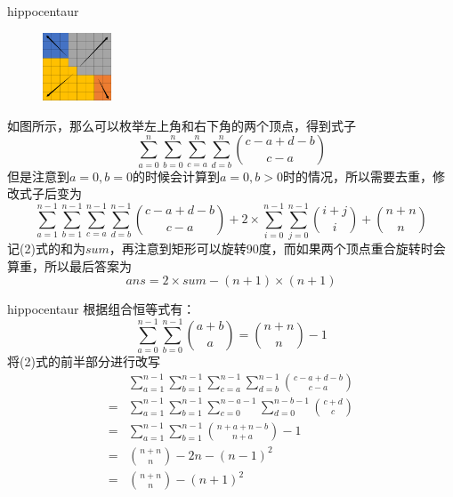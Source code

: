 \documentclass[9pt]{beamer}
\begin{document}
  \begin{frame}{hippocentaur}
    \begin{figure}[htbp]
      \centering\includegraphics[width=0.8in]{insol.png}
      \end{figure}
     如图所示，那么可以枚举左上角和右下角的两个顶点，得到式子
    \begin{equation}
      \sum_{a=0}^n\sum_{b=0}^n\sum_{c=a}^n\sum_{d=b}^n \binom{c-a+d-b}{c-a}
    \end{equation}
     但是注意到$a=0,b=0$的时候会计算到$a=0,b>0$时的情况，所以需要去重，修改式子后变为
    \begin{equation}
      \sum_{a=1}^{n-1}\sum_{b=1}^{n-1}\sum_{c=a}^{n-1}\sum_{d=b}^{n-1} \binom{c-a+d-b}{c-a}+2\times \sum_{i=0}^{n-1}\sum_{j=0}^{n-1}\binom{i+j}{i}+\binom{n+n}{n}
    \end{equation}
     记(2)式的和为$sum$，再注意到矩形可以旋转90度，而如果两个顶点重合旋转时会算重，所以最后答案为
    \begin{equation}
      ans=2\times sum-(n+1)\times (n+1)
    \end{equation}
  \end{frame}

  \begin{frame}{hippocentaur}
     根据组合恒等式有：
    \begin{equation}
      \sum_{a=0}^{n-1}\sum_{b=0}^{n-1}\binom{a+b}{a}=\binom{n+n}{n}-1
    \end{equation}
     将(2)式的前半部分进行改写
    \begin{equation}
      \begin{aligned}
      &\sum_{a=1}^{n-1}\sum_{b=1}^{n-1}\sum_{c=a}^{n-1}\sum_{d=b}^{n-1}\binom{c-a+d-b}{c-a}\\
      =&\sum_{a=1}^{n-1}\sum_{b=1}^{n-1}\sum_{c=0}^{n-a-1}\sum_{d=0}^{n-b-1}\binom{c+d}{c}\\
      =&\sum_{a=1}^{n-1}\sum_{b=1}^{n-1}\binom{n+a+n-b}{n+a}-1\\
      =&\binom{n+n}{n}-2n-(n-1)^2\\
      =&\binom{n+n}{n}-(n+1)^2
    \end{aligned}
    \end{equation}
  \end{frame}
\end{document}
